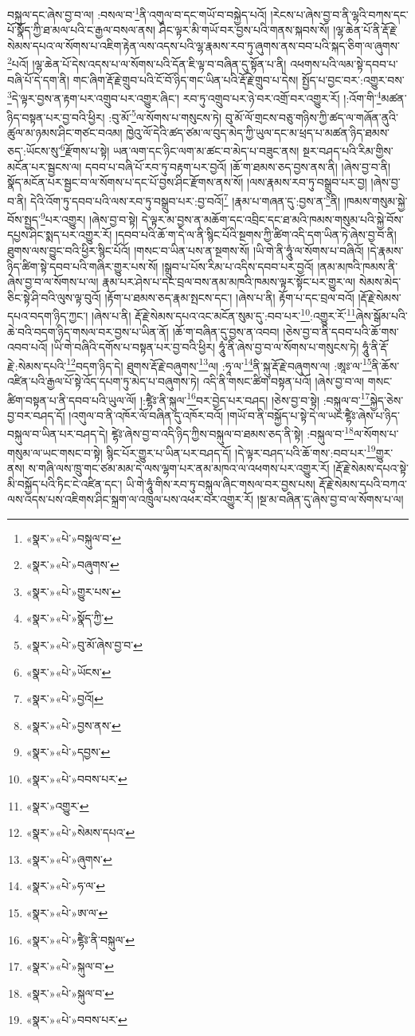 བསྐུལ་དང་ཞེས་བྱ་བ་ལ། :བསལ་བ་\footnote{«སྣར་»«པེ་»བསྐུལ་བ་}ནི་འགུལ་བ་དང་གཡོ་བ་བསྐྱེད་པའོ། །རེངས་པ་ཞེས་བྱ་བ་ནི་ལྷའི་བཀས་དང་པོ་སྣོད་ཀྱི་ཐ་མལ་པའི་ང་རྒྱལ་བསལ་ནས། ཤིང་ལྟར་མི་གཡོ་བར་བྱས་པའི་གནས་སྐབས་སོ། །ལྷ་ཆེན་པོ་ནི་རྡོ་རྗེ་སེམས་དཔའ་ལ་སོགས་པ་འཇིག་རྟེན་ལས་འདས་པའི་ལྷ་རྣམས་རབ་ཏུ་ཞུགས་ནས་བབ་པའི་སྐད་ཅིག་ལ་ཞུགས་\footnote{«སྣར་»«པེ་»བཞུགས་}པའོ། །ལྷ་ཆེན་པོ་དེས་འདས་པ་ལ་སོགས་པའི་དོན་ཇི་ལྟ་བ་བཞིན་དུ་སྟོན་པ་ནི། འཕགས་པའི་ལམ་སྟེ་དབབ་པ་བཞི་པོ་དེ་དག་ནི། གང་ཞིག་རྡོ་རྗེ་གྲུབ་པའི་ངོ་བོ་ཉིད་གང་ཡིན་པའི་རྡོ་རྗེ་གྲུབ་པ་དེས། སྤྱོད་པ་བྱང་བར་:འགྱུར་བས་\footnote{«སྣར་»«པེ་»གྱུར་པས་}དེ་ལྟར་བྱས་ན་རྟག་པར་འགྲུབ་པར་འགྱུར་ཞིང་། རབ་ཏུ་འགྲུབ་པར་ཉེ་བར་འགྲོ་བར་འགྱུར་རོ། །:འོག་གི་\footnote{«སྣར་»«པེ་»སྣོད་ཀྱི་}མཚན་ཉིད་བསྟན་པར་བྱ་བའི་ཕྱིར། :བུ་མོ་\footnote{«སྣར་»«པེ་»བུ་མོ་ཞེས་བྱ་བ་}ལ་སོགས་པ་གསུངས་ཏེ། བུ་མོ་ལོ་གྲངས་བཅུ་གཉིས་ཀྱི་ཚད་ལ་གཞོན་ནུའི་ཚུལ་མ་ཉམས་ཤིང་གཙང་བའམ། ཁྱེའུ་ལོ་དེའི་ཚད་ཙམ་ལ་བུད་མེད་ཀྱི་ཡུལ་དང་མ་ཕྲད་པ་མཚན་ཉིད་ཐམས་ཅད་:ཡོངས་སུ་\footnote{«སྣར་»«པེ་»ཡོངས་}རྫོགས་པ་སྟེ། ཡན་ལག་དང་ཉིང་ལག་མ་ཚང་བ་མེད་པ་བཟུང་ནས། སྔར་བཤད་པའི་རིམ་གྱིས་མངོན་པར་སྦྱངས་ལ། དབབ་པ་བཞི་པོ་རབ་ཏུ་བརྟག་པར་བྱའོ། །ཆོ་ག་ཐམས་ཅད་བྱས་ནས་ནི། །ཞེས་བྱ་བ་ནི། སྣོད་མངོན་པར་སྦྱང་བ་ལ་སོགས་པ་དང་པོ་བྱས་ཤིང་རྫོགས་ནས་སོ། །ལས་རྣམས་རབ་ཏུ་བསྒྲུབ་པར་བྱ། །ཞེས་བྱ་བ་ནི། དེའི་འོག་ཏུ་དབབ་པའི་ལས་རབ་ཏུ་བསྒྲུབ་པར་:བྱ་བའོ།\footnote{«སྣར་»«པེ་»བྱའོ།} །རྣམ་པ་གཞན་དུ་:བྱས་ན་\footnote{«སྣར་»«པེ་»བྱས་ནས་}ནི། །ཁམས་གསུམ་སྐྱེ་བོས་སྤྱད་\footnote{«སྣར་»«པེ་»དབྱས་}པར་འགྱུར། །ཞེས་བྱ་བ་སྟེ། དེ་ལྟར་མ་བྱས་ན་མཆོག་དང་འབྲིང་དང་ཐ་མའི་ཁམས་གསུམ་པའི་སྐྱེ་བོས་དཔྱས་ཤིང་སྨད་པར་འགྱུར་རོ། །དབབ་པའི་ཆོ་ག་དེ་ལ་ནི་སྙིང་པོའི་སྔགས་ཀྱི་ཚིག་འདི་དག་ཡིན་ཏེ་ཞེས་བྱ་བ་ནི། ཐུགས་ལས་བྱུང་བའི་ཕྱིར་སྙིང་པོའོ། །གསང་བ་ཡིན་པས་ན་སྔགས་སོ། །ཡི་གེ་ནི་ཧཱུཾ་ལ་སོགས་པ་བཞིའོ། །དེ་རྣམས་ཉིད་ཚིག་སྟེ་དབབ་པའི་གཞིར་གྱུར་པས་སོ། །སྒྲུབ་པ་པོས་རིམ་པ་འདིས་དབབ་པར་བྱའོ། །ནམ་མཁའི་ཁམས་ནི་ཞེས་བྱ་བ་ལ་སོགས་པ་ལ། རྣམ་པར་ཤེས་པ་དང་བྲལ་བས་ནམ་མཁའི་ཁམས་ལྟར་སྟོང་པར་གྱུར་ལ། སེམས་མེད་ཅིང་སྟེ་ཤི་བའི་ལུས་ལྟ་བུའོ། །རྟོག་པ་ཐམས་ཅད་རྣམ་སྤངས་དང་། །ཞེས་པ་ནི། རྟོག་པ་དང་བྲལ་བའོ། །རྡོ་རྗེ་སེམས་དཔའ་བདག་ཉིད་ཀྱང་། །ཞེས་པ་ནི། རྡོ་རྗེ་སེམས་དཔའ་འང་མངོན་སུམ་དུ་:བབ་པར་\footnote{«སྣར་»«པེ་»བབས་པར་}:འགྱུར་རོ་\footnote{«སྣར་»འགྱུར་}ཞེས་སྒོམ་པའི་ཆེ་བའི་བདག་ཉིད་གསལ་བར་བྱས་པ་ཡིན་ནོ། །ཆོ་ག་བཞིན་དུ་བྱས་ན་འབབ། །ཅེས་བྱ་བ་ནི་དབབ་པའི་ཆོ་གས་འབབ་པའོ། །ཡི་གེ་བཞིའི་དགོས་པ་བསྟན་པར་བྱ་བའི་ཕྱིར། ཧཱུཾ་ནི་ཞེས་བྱ་བ་ལ་སོགས་པ་གསུངས་ཏེ། ཧཱུཾ་ནི་རྡོ་རྗེ་:སེམས་དཔའི་\footnote{«སྣར་»«པེ་»སེམས་དཔའ་}བདག་ཉིད་དེ། ཐུགས་རྡོ་རྗེ་བཞུགས་\footnote{«སྣར་»«པེ་»ཞུགས་}ལ། :ཧཱ་ལ་\footnote{«སྣར་»«པེ་»ཧ་ལ་}ནི་སྐུ་རྡོ་རྗེ་བཞུགས་ལ། :ཨཱཿ་ལ་\footnote{«སྣར་»«པེ་»ཨ་ལ་}ནི་ཆོས་འཛིན་པའི་རྒྱལ་པོ་སྟེ་འོད་དཔག་ཏུ་མེད་པ་བཞུགས་ཏེ། འདི་ནི་གསང་ཚིག་བསྟན་པའོ། །ཞེས་བྱ་བ་ལ། གསང་ཚིག་བསྟན་པ་ནི་དབབ་པའི་ཡུལ་ལོ། །:ཛྷཻཿ་ནི་སྐུལ་\footnote{«སྣར་»«པེ་»ཛྷཻཿ་ནི་བསྐུལ་}བར་བྱེད་པར་བཤད། །ཅེས་བྱ་བ་སྟེ། :བསྐུལ་བ་\footnote{«སྣར་»«པེ་»སྐུལ་བ་}སྐྱེད་ཅེས་བྱ་བར་བཤད་དོ། །འགུལ་བ་ནི་འཁོར་ལོ་བཞིན་དུ་འཁོར་བའོ། །གཡོ་བ་ནི་བསྐྱོད་པ་སྟེ་དེ་ལ་ཡང་ཛྷཻཿ་ཞེས་པ་ཉིད་བསྐུལ་བ་ཡིན་པར་བཤད་དེ། ཛྷེཿ་ཞེས་བྱ་བ་འདི་ཉིད་ཀྱིས་བསྐུལ་བ་ཐམས་ཅད་ནི་སྟེ། :བསྐུལ་བ་\footnote{«སྣར་»«པེ་»སྐུལ་བ་}ལ་སོགས་པ་གསུམ་ལ་ཡང་གསང་བ་སྟེ། སྙིང་པོར་གྱུར་པ་ཡིན་པར་བཤད་དོ། །དེ་ལྟར་བཤད་པའི་ཆོ་གས་:བབ་པར་\footnote{«སྣར་»«པེ་»བབས་པར་}གྱུར་ནས། ས་གཞི་ལས་ཁྲུ་གང་ཙམ་མམ་དེ་ལས་ལྷག་པར་ནམ་མཁའ་ལ་འཕགས་པར་འགྱུར་རོ། །རྡོ་རྗེ་སེམས་དཔའ་སྟེ་མི་བསྐྱོད་པའི་ཏིང་ངེ་འཛིན་དང་། ཡི་གེ་ཧཱུཾ་གིས་རབ་ཏུ་བསྐུལ་ཞིང་གསལ་བར་བྱས་པས། རྡོ་རྗེ་སེམས་དཔའི་བཀའ་ལས་འདས་པས་འཇིགས་ཤིང་སྐྲག་ལ་འཁྲུལ་པས་འཕར་བར་འགྱུར་རོ། །སྔ་མ་བཞིན་དུ་ཞེས་བྱ་བ་ལ་སོགས་པ་ལ། 